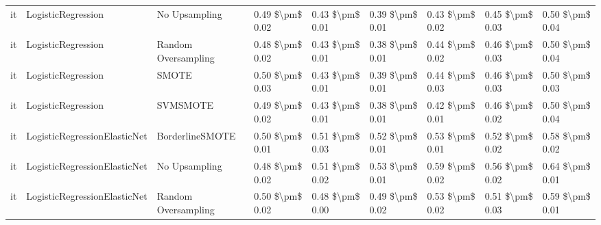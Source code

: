 \begin{tabular}{lllllllll}
      it &              LogisticRegression &                 No Upsampling &     0.49 \$\textbackslash pm\$ 0.02 &           0.43 \$\textbackslash pm\$ 0.01 &       0.39 \$\textbackslash pm\$ 0.01 &        0.43 \$\textbackslash pm\$ 0.02 &                         0.45 \$\textbackslash pm\$ 0.03 &     0.50 \$\textbackslash pm\$ 0.04 \\
      it &              LogisticRegression &           Random Oversampling &     0.48 \$\textbackslash pm\$ 0.02 &           0.43 \$\textbackslash pm\$ 0.01 &       0.38 \$\textbackslash pm\$ 0.01 &        0.44 \$\textbackslash pm\$ 0.02 &                         0.46 \$\textbackslash pm\$ 0.03 &     0.50 \$\textbackslash pm\$ 0.04 \\
      it &              LogisticRegression &                         SMOTE &     0.50 \$\textbackslash pm\$ 0.03 &           0.43 \$\textbackslash pm\$ 0.01 &       0.39 \$\textbackslash pm\$ 0.01 &        0.44 \$\textbackslash pm\$ 0.03 &                         0.46 \$\textbackslash pm\$ 0.03 &     0.50 \$\textbackslash pm\$ 0.03 \\
      it &              LogisticRegression &                      SVMSMOTE &     0.49 \$\textbackslash pm\$ 0.02 &           0.43 \$\textbackslash pm\$ 0.01 &       0.38 \$\textbackslash pm\$ 0.01 &        0.42 \$\textbackslash pm\$ 0.01 &                         0.46 \$\textbackslash pm\$ 0.02 &     0.50 \$\textbackslash pm\$ 0.04 \\
      it &    LogisticRegressionElasticNet &               BorderlineSMOTE &     0.50 \$\textbackslash pm\$ 0.01 &           0.51 \$\textbackslash pm\$ 0.03 &       0.52 \$\textbackslash pm\$ 0.01 &        0.53 \$\textbackslash pm\$ 0.01 &                         0.52 \$\textbackslash pm\$ 0.02 &     0.58 \$\textbackslash pm\$ 0.02 \\
      it &    LogisticRegressionElasticNet &                 No Upsampling &     0.48 \$\textbackslash pm\$ 0.02 &           0.51 \$\textbackslash pm\$ 0.02 &       0.53 \$\textbackslash pm\$ 0.01 &        0.59 \$\textbackslash pm\$ 0.02 &                         0.56 \$\textbackslash pm\$ 0.02 &     0.64 \$\textbackslash pm\$ 0.01 \\
      it &    LogisticRegressionElasticNet &           Random Oversampling &     0.50 \$\textbackslash pm\$ 0.02 &           0.48 \$\textbackslash pm\$ 0.00 &       0.49 \$\textbackslash pm\$ 0.02 &        0.53 \$\textbackslash pm\$ 0.02 &                         0.51 \$\textbackslash pm\$ 0.03 &     0.59 \$\textbackslash pm\$ 0.01 \\

\end{tabular}
